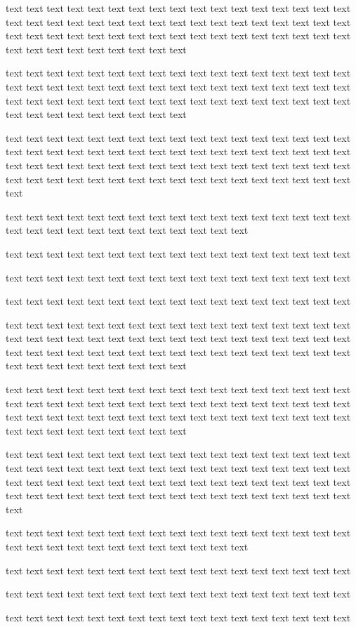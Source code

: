 \documentclass{article}
\begin{document}
text text text text text text text text text text text text text text text text text text text text text text text text text text text text text text text text text text text text text text text text text text text text text text text text text text text text text text text text text text text text

    text text text text text text text text text text text text text text text text text text text text text text text text text text text text text text text text text text text text text text text text text text text text text text text text text text text text text text text text text text text text

    text text text text text text text text text text text text text text text text text text text text text text text text text text text text text text text text text text text text text text text text text text text text text text text text text text text text text text text text text text text text text text text text text text text text text

    text text text text text text text text text text text text text text text text text text text text text text text text text text text text text

    text text text text text text text text text text text text text text text text text

    text text text text text text text text text text text text text text text text text

    text text text text text text text text text text text text text text text text text

text text text text text text text text text text text text text text text text text text text text text text text text text text text text text text text text text text text text text text text text text text text text text text text text text text text text text text text text text text text text

    text text text text text text text text text text text text text text text text text text text text text text text text text text text text text text text text text text text text text text text text text text text text text text text text text text text text text text text text text text text text

    text text text text text text text text text text text text text text text text text text text text text text text text text text text text text text text text text text text text text text text text text text text text text text text text text text text text text text text text text text text text text text text text text text text text text

    text text text text text text text text text text text text text text text text text text text text text text text text text text text text text

    text text text text text text text text text text text text text text text text text

    text text text text text text text text text text text text text text text text text

    text text text text text text text text text text text text text text text text text



\end{document}
